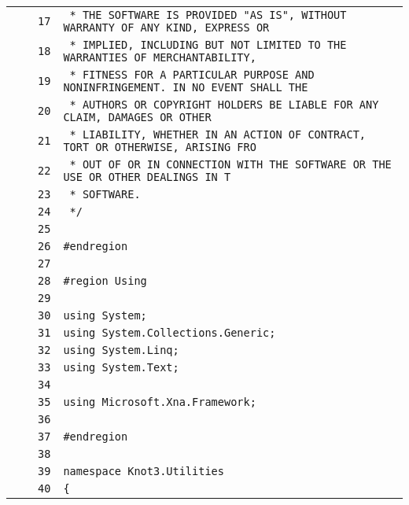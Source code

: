 \documentclass[a4paper,10pt]{article}
\begin{document}
\begin{longtable}[l]{lrrl}
\cellcolor{gray} &  & \verb~17~ & \verb~ * THE SOFTWARE IS PROVIDED "AS IS", WITHOUT WARRANTY OF ANY KIND, EXPRESS OR~\\
\cellcolor{gray} &  & \verb~18~ & \verb~ * IMPLIED, INCLUDING BUT NOT LIMITED TO THE WARRANTIES OF MERCHANTABILITY,~\\
\cellcolor{gray} &  & \verb~19~ & \verb~ * FITNESS FOR A PARTICULAR PURPOSE AND NONINFRINGEMENT. IN NO EVENT SHALL THE~\\
\cellcolor{gray} &  & \verb~20~ & \verb~ * AUTHORS OR COPYRIGHT HOLDERS BE LIABLE FOR ANY CLAIM, DAMAGES OR OTHER~\\
\cellcolor{gray} &  & \verb~21~ & \verb~ * LIABILITY, WHETHER IN AN ACTION OF CONTRACT, TORT OR OTHERWISE, ARISING FRO~\\
\cellcolor{gray} &  & \verb~22~ & \verb~ * OUT OF OR IN CONNECTION WITH THE SOFTWARE OR THE USE OR OTHER DEALINGS IN T~\\
\cellcolor{gray} &  & \verb~23~ & \verb~ * SOFTWARE.~\\
\cellcolor{gray} &  & \verb~24~ & \verb~ */~\\
\cellcolor{gray} &  & \verb~25~ & \verb~~\\
\cellcolor{gray} &  & \verb~26~ & \verb~#endregion~\\
\cellcolor{gray} &  & \verb~27~ & \verb~~\\
\cellcolor{gray} &  & \verb~28~ & \verb~#region Using~\\
\cellcolor{gray} &  & \verb~29~ & \verb~~\\
\cellcolor{gray} &  & \verb~30~ & \verb~using System;~\\
\cellcolor{gray} &  & \verb~31~ & \verb~using System.Collections.Generic;~\\
\cellcolor{gray} &  & \verb~32~ & \verb~using System.Linq;~\\
\cellcolor{gray} &  & \verb~33~ & \verb~using System.Text;~\\
\cellcolor{gray} &  & \verb~34~ & \verb~~\\
\cellcolor{gray} &  & \verb~35~ & \verb~using Microsoft.Xna.Framework;~\\
\cellcolor{gray} &  & \verb~36~ & \verb~~\\
\cellcolor{gray} &  & \verb~37~ & \verb~#endregion~\\
\cellcolor{gray} &  & \verb~38~ & \verb~~\\
\cellcolor{gray} &  & \verb~39~ & \verb~namespace Knot3.Utilities~\\
\cellcolor{gray} &  & \verb~40~ & \verb~{~\\

\end{longtable}
\end{document}
